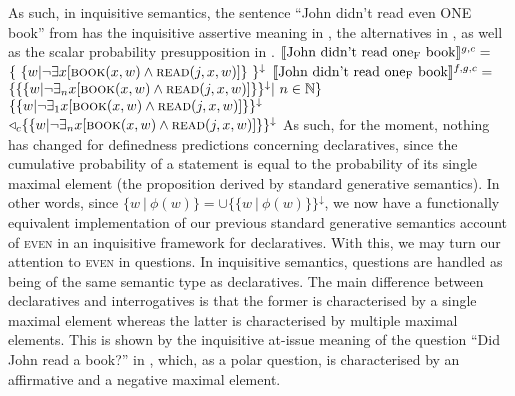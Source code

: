 \ex{}
{}
\xe
\ex{} 
{}
\xe
As such, in inquisitive semantics, the sentence \enquote{John didn't read even \MakeUppercase{one} book} from  has the inquisitive assertive meaning in , the alternatives in , as well as the scalar probability presupposition in .
\pex[nopreamble=true]%
\a{} $\intension[g,c]{John didn't read one\textsubscript{F} book}=$\\\emptyfill$\{~\{w|\neg\exists{x}[\predicate{book}(x,w)\land\predicate{read}(j,x,w)]\}~\}^\downarrow$
\a{} $\intension[f,g,c]{John didn't read one\textsubscript{F} book}=$\\\emptyfill$\{\{\{w|\neg\exists_n{x}[\predicate{book}(x,w)\land\predicate{read}(j,x,w)]\}\}^\downarrow|~n\in\mathbb{N}\}$
\xe
\ex{}
{}\\
$\{\{w|\neg\exists_1{x}[\predicate{book}(x,w)\land\predicate{read}(j,x,w)]\}\}^\downarrow$\\\emptyfill$\lprob_c\{\{w|\neg\exists_n{x}[\predicate{book}(x,w)\land\predicate{read}(j,x,w)]\}\}^\downarrow$
\xe
As such, for the moment, nothing has changed for definedness predictions concerning declaratives, since the cumulative probability of a statement is equal to the probability of its single maximal element (the proposition derived by standard generative semantics). In other words, since $\{w~|~\phi(w)\}=\cup\{\{w~|~\phi(w)\}\}^\downarrow$, we now have a functionally equivalent implementation of our previous standard generative semantics account of {\scshape even} in an inquisitive framework for declaratives. With this, we may turn our attention to {\scshape even} in questions. In inquisitive semantics, questions are handled as being of the same semantic type as declaratives. The main difference between declaratives and interrogatives is that the former is characterised by a single maximal element whereas the latter is characterised by multiple maximal elements. This is shown by the inquisitive at-issue meaning of the question \enquote{Did John read a book?} in , which, as a polar question, is characterised by an affirmative and a negative maximal element.
